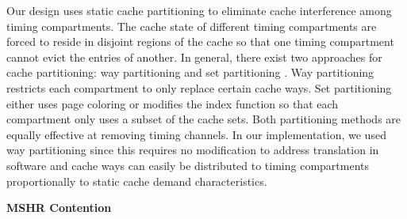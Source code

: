Our design uses static cache partitioning to eliminate cache
interference among timing compartments.
The cache state of different timing compartments are forced to reside in 
disjoint regions of the cache so that one timing compartment cannot evict the 
entries of another.
In general, there exist two approaches for cache partitioning:
way partitioning \cite{dynamic_partitioning} and
set partitioning \cite{rtas_cache_framework}. Way partitioning restricts
each compartment to only replace certain cache ways. Set partitioning
either uses page coloring or modifies the index function so that each 
compartment
only uses a subset of the cache sets. Both partitioning methods are equally
effective at removing timing channels. In our implementation, we used way 
partitioning since this requires no modification to address translation in 
software and cache ways can easily be distributed to timing compartments 
proportionally to static cache demand characteristics.





\textbf{MSHR Contention}

